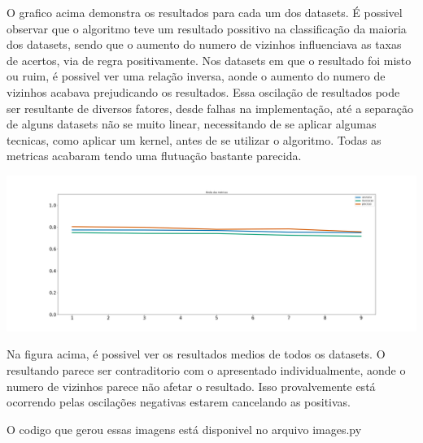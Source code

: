 \documentclass{article}
\begin{document}
O grafico acima demonstra os resultados para cada um dos datasets. É possivel observar que o algoritmo teve um resultado possitivo na classificação da maioria dos datasets, sendo que o aumento do numero de vizinhos influenciava as taxas de acertos, via de regra positivamente. Nos datasets em que o resultado
foi misto ou ruim, é possivel ver uma relação inversa, aonde o aumento do numero de vizinhos acabava prejudicando os resultados. Essa oscilação de resultados pode ser resultante de diversos fatores, desde falhas na implementação, até a separação de alguns datasets não se muito linear, necessitando de se aplicar
algumas tecnicas, como aplicar um kernel, antes de se utilizar o algoritmo. Todas as metricas acabaram tendo uma flutuação bastante parecida. 

\includegraphics[width=\textwidth]{metricas.png}

Na figura acima, é possivel ver os resultados medios de todos os datasets. O resultando parece ser contraditorio com o apresentado individualmente, aonde o numero de vizinhos parece não afetar o resultado. Isso provalvemente está ocorrendo pelas oscilações negativas estarem cancelando as positivas.

O codigo que gerou essas imagens está disponivel no arquivo images.py
\end{document}
